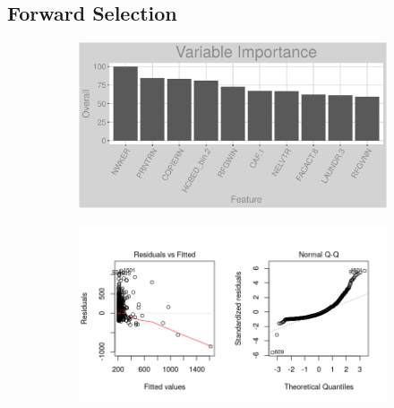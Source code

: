 \subsection{Forward Selection}
\label{appendix:fuel_oil:lp}
\begin{figure}[h]
\centering
\begin{subfigure}{1\textwidth}
\centering
\includegraphics[width=.99\textwidth, height=0.3\textheight]{Images/fuel_oil_lp_vars.png}
\end{subfigure}
\begin{subfigure}{1\textwidth}
\centering
\includegraphics[width=.99\textwidth, height=0.475\textheight]{Images/fuel_oil_lp_res_1.png}
\end{subfigure}
\end{figure}
\FloatBarrier
\newpage
